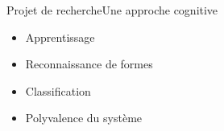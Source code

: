 \begin{frame}{Projet de recherche}{Une approche cognitive}
\begin{itemize}
\item Apprentissage
\item Reconnaissance de formes
\item Classification
\item Polyvalence du système
\end{itemize}
\end{frame}
